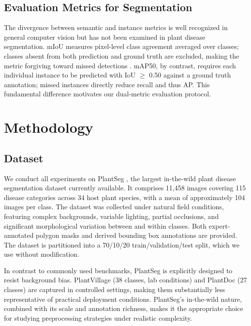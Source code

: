 \documentclass[preprint,12pt]{elsarticle}
\begin{document}
\subsection{Evaluation Metrics for Segmentation}
The divergence between semantic and instance metrics is well recognized in general computer vision \citep{garcia2017review, cordts2016cityscapes} but has not been examined in plant disease segmentation. mIoU measures pixel-level class agreement averaged over classes; classes absent from both prediction and ground truth are excluded, making the metric forgiving toward missed detections \citep{rethink2021segeval}. mAP50, by contrast, requires each individual instance to be predicted with IoU $\geq$ 0.50 against a ground truth annotation; missed instances directly reduce recall and thus AP. This fundamental difference motivates our dual-metric evaluation protocol.

\section{Methodology}
\label{sec:methodology}

\subsection{Dataset}

We conduct all experiments on PlantSeg \citep{plantseg2024}, the largest in-the-wild plant disease segmentation dataset currently available. It comprises 11,458 images covering 115 disease categories across 34 host plant species, with a mean of approximately 104 images per class. The dataset was collected under natural field conditions, featuring complex backgrounds, variable lighting, partial occlusions, and significant morphological variation between and within classes. Both expert-annotated polygon masks and derived bounding box annotations are provided. The dataset is partitioned into a 70/10/20 train/validation/test split, which we use without modification.

In contrast to commonly used benchmarks, PlantSeg is explicitly designed to resist background bias. PlantVillage \citep{hughes2015open} (38 classes, lab conditions) and PlantDoc \citep{singh2020plantdoc} (27 classes) are captured in controlled settings, making them substantially less representative of practical deployment conditions. PlantSeg's in-the-wild nature, combined with its scale and annotation richness, makes it the appropriate choice for studying preprocessing strategies under realistic complexity.
\end{document}
